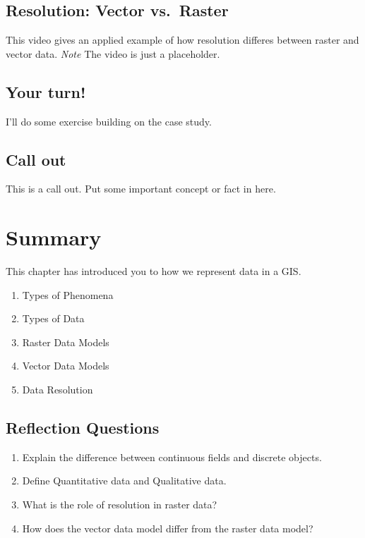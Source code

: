 \documentclass[
]{book}
\providecommand{\tightlist}{%
  \setlength{\itemsep}{0pt}\setlength{\parskip}{0pt}}
\begin{document}
\hypertarget{resolution-vector-vs.-raster}{%
\subsection{Resolution: Vector vs.~Raster}\label{resolution-vector-vs.-raster}}

This video gives an applied example of how resolution differes between raster and vector data. \emph{Note} The video is just a placeholder.

\hypertarget{your-turn-1}{%
\subsection*{Your turn!}\label{your-turn-1}}

I'll do some exercise building on the case study.

\hypertarget{call-out}{%
\subsection*{Call out}\label{call-out}}

This is a call out. Put some important concept or fact in here.

\hypertarget{summary-2}{%
\section{Summary}\label{summary-2}}

This chapter has introduced you to how we represent data in a GIS.

\begin{enumerate}
\def\labelenumi{\arabic{enumi}.}
\tightlist
\item
  Types of Phenomena
\item
  Types of Data
\item
  Raster Data Models
\item
  Vector Data Models
\item
  Data Resolution
\end{enumerate}

\hypertarget{reflection-questions-1}{%
\subsection*{Reflection Questions}\label{reflection-questions-1}}

\begin{enumerate}
\def\labelenumi{\arabic{enumi}.}
\tightlist
\item
  Explain the difference between continuous fields and discrete objects.
\item
  Define Quantitative data and Qualitative data.
\item
  What is the role of resolution in raster data?
\item
  How does the vector data model differ from the raster data model?
\end{enumerate}
\end{document}
